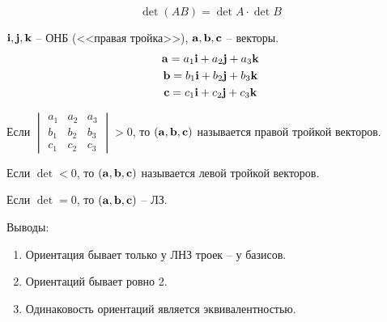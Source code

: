 \begin{theorem}
    \[\det (AB) = \det A \cdot \det B\]
\end{theorem}

\begin{definition}[Ориентация]
    $\mathbf{i}, \mathbf{j}, \mathbf{k}$ -- ОНБ (<<правая тройка>>), $\mathbf{a}, \mathbf{b}, \mathbf{c}$ -- векторы.
    \begin{gather*}
        \mathbf{a} = a_1 \mathbf{i} + a_2 \mathbf{j} + a_3 \mathbf{k}\\
        \mathbf{b} = b_1 \mathbf{i} + b_2 \mathbf{j} + b_3 \mathbf{k}\\
        \mathbf{c} = c_1 \mathbf{i} + c_2 \mathbf{j} + c_3 \mathbf{k}
    \end{gather*}

    Если $\begin{vmatrix}
            a_1 & a_2 & a_3 \\
            b_1 & b_2 & b_3 \\
            c_1 & c_2 & c_3
        \end{vmatrix} > 0$, то $(\mathbf{a}, \mathbf{b}, \mathbf{c})$ называется правой тройкой векторов.

    Если $\det < 0$, то $(\mathbf{a}, \mathbf{b}, \mathbf{c})$ называется левой тройкой векторов.

    Если $\det = 0$, то $(\mathbf{a}, \mathbf{b}, \mathbf{c})$ -- ЛЗ.
\end{definition}

Выводы:
\begin{enumerate}
    \item Ориентация бывает только у ЛНЗ троек -- у базисов.
    \item Ориентаций бывает ровно 2.
    \item Одинаковость ориентаций является эквивалентностью.
\end{enumerate}